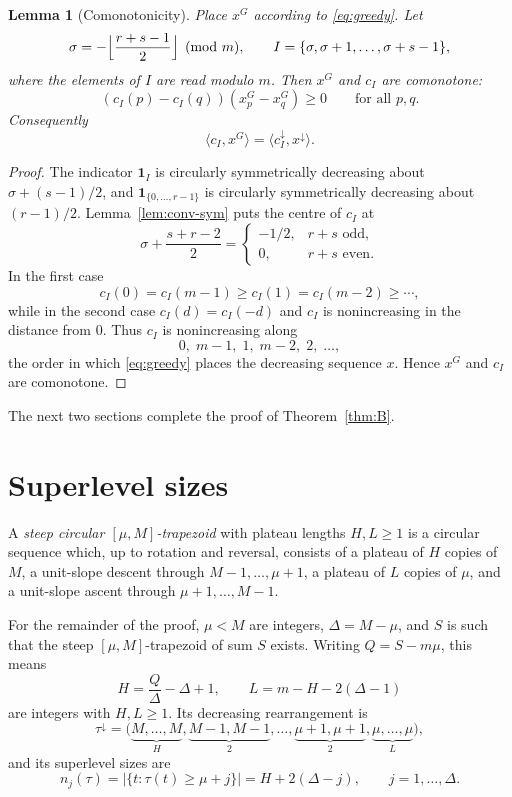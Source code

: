\documentclass[11pt]{article}
\newtheorem{lemma}[theorem]{Lemma}
\theoremstyle{definition}
\newcommand{\ind}{\mathbf{1}}
\begin{document}
\begin{lemma}[Comonotonicity]\label{lem:comono}
Place $x^G$ according to \eqref{eq:greedy}. Let
\[
\sigma=-\Bigl\lfloor\frac{r+s-1}{2}\Bigr\rfloor\pmod m,
\qquad
I=\{\sigma,\sigma+1,\dots,\sigma+s-1\},
\]
where the elements of $I$ are read modulo $m$.
Then $x^G$ and $c_I$ are comonotone:
\[
(c_I(p)-c_I(q))(x^G_p-x^G_q)\ge0
\qquad\text{for all }p,q.
\]
Consequently
\[
\langle c_I,x^G\rangle=\langle c_I^\downarrow,x^\downarrow\rangle.
\]
\end{lemma}

\begin{proof}
The indicator $\ind_I$ is circularly symmetrically decreasing about $\sigma+(s-1)/2$, and $\ind_{\{0,\dots,r-1\}}$ is circularly symmetrically decreasing about $(r-1)/2$. Lemma~\ref{lem:conv-sym} puts the centre of $c_I$ at
\[
\sigma+\frac{s+r-2}{2}
=
\begin{cases}
-1/2,&r+s\text{ odd},\\
0,&r+s\text{ even}.
\end{cases}
\]
In the first case
\[
c_I(0)=c_I(m-1)\ge c_I(1)=c_I(m-2)\ge\cdots,
\]
while in the second case $c_I(d)=c_I(-d)$ and $c_I$ is nonincreasing in the distance from $0$. Thus $c_I$ is nonincreasing along
\[
0,\;m-1,\;1,\;m-2,\;2,\;\dots,
\]
the order in which \eqref{eq:greedy} places the decreasing sequence $x$. Hence $x^G$ and $c_I$ are comonotone.
\end{proof}

The next two sections complete the proof of Theorem~\ref{thm:B}.

\section{Superlevel sizes}

A \emph{steep circular $[\mu,M]$-trapezoid} with plateau lengths $H,L\ge1$ is a circular sequence which, up to rotation and reversal, consists of a plateau of $H$ copies of $M$, a unit-slope descent through $M-1,\dots,\mu+1$, a plateau of $L$ copies of $\mu$, and a unit-slope ascent through $\mu+1,\dots,M-1$.

For the remainder of the proof, $\mu<M$ are integers, $\Delta=M-\mu$, and $S$ is such that the steep $[\mu,M]$-trapezoid of sum $S$ exists. Writing $Q=S-m\mu$, this means
\[
H=\frac{Q}{\Delta}-\Delta+1,
\qquad
L=m-H-2(\Delta-1)
\]
are integers with $H,L\ge1$. Its decreasing rearrangement is
\[
\tau^\downarrow
=\bigl(
\underbrace{M,\dots,M}_{H},
\underbrace{M-1,M-1}_{2},\dots,
\underbrace{\mu+1,\mu+1}_{2},
\underbrace{\mu,\dots,\mu}_{L}
\bigr),
\]
and its superlevel sizes are
\begin{equation}\label{eq:n-tau}
 n_j(\tau)=|\{t:\tau(t)\ge\mu+j\}|
 =H+2(\Delta-j),
 \qquad j=1,\dots,\Delta.
\end{equation}
\end{document}
